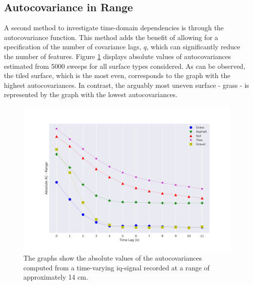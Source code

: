 \subsection{Autocovariance in Range}
\label{ACr}


A second method to investigate time-domain dependencies is through the autocovariance function. This method adds the benefit of allowing for a specification of the number of covariance lags, $q$, which can significantly reduce the number of features. Figure \ref{fig:autocorr_range} displays absolute values of autocovariances estimated from 5000 sweeps for all surface types considered. As can be observed, the tiled surface, which is the most even, corresponds to the graph with the highest autocovariances. In contrast, the arguably most uneven surface - grass - is represented by the graph with the lowest autocovariances.

\begin{figure}[h]
	\centering
	\includegraphics[scale=0.45]{figs_temp/features/autocorr_range.png}
	\caption{The graphs show the absolute values of the autocovariances computed from a time-varying \gls{iq}-signal recorded at a range of approximately 14 cm.}
	\label{fig:autocorr_range}
\end{figure}

